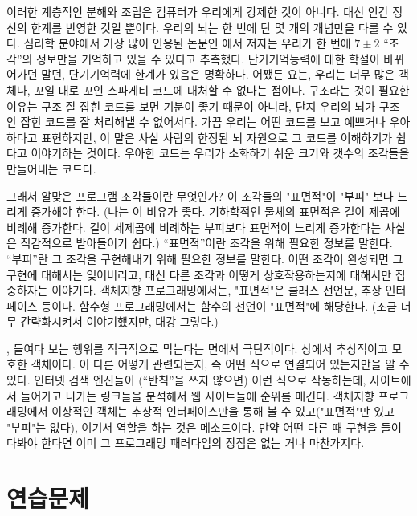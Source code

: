 이러한 계층적인 분해와 조립은 컴퓨터가 우리에게 강제한 것이 아니다.
대신 인간 정신의 한계를 반영한 것일 뿐이다. 우리의 뇌는 한 번에 단 몇 개의 개념만을 다룰 수 있다.
심리학 분야에서 가장 많이 인용된 논문인 
에서 저자는 우리가 한 번에 $7 \pm 2$ ``조각''의 정보만을 기억하고 있을 수 있다고 추측했다.
단기기억능력에 대한 학설이 바뀌어가던 말던, 단기기억력에 한계가 있음은 명확하다.
어쨌든 요는, 우리는 너무 많은 객체나, 꼬일 대로 꼬인 스파게티 코드에 대처할 수 없다는 점이다.
구조라는 것이 필요한 이유는 구조 잘 잡힌 코드를 보면 기분이 좋기 때문이 아니라,
단지 우리의 뇌가 구조 안 잡힌 코드를 잘 처리해낼 수 없어서다.
가끔 우리는 어떤 코드를 보고 예쁘거나 우아하다고 표현하지만, 이 말은 사실
사람의 한정된 뇌 자원으로 그 코드를 이해하기가 쉽다고 이야기하는 것이다.
우아한 코드는 우리가 소화하기 쉬운 크기와 갯수의 조각들을 만들어내는 코드다.

그래서  알맞은 프로그램 조각들이란 무엇인가?
이 조각들의 "표면적"이 "부피" 보다 느리게 증가해야 한다.
(나는 이 비유가 좋다. 기하학적인 물체의 표면적은 길이 제곱에 비례해 증가한다.
길이 세제곱에 비례하는 부피보다 표면적이 느리게 증가한다는 사실은 직감적으로 받아들이기 쉽다.)
``표면적''이란 조각을  위해 필요한 정보를 말한다.
``부피''란 그 조각을 구현해내기 위해 필요한 정보를 말한다.
어떤 조각이 완성되면 그 구현에 대해서는 잊어버리고,
대신 다른 조각과 어떻게 상호작용하는지에 대해서만 집중하자는 이야기다.
객체지향 프로그래밍에서는, "표면적"은 클래스 선언문, 추상 인터페이스 등이다.
함수형 프로그래밍에서는 함수의 선언이 "표면적"에 해당한다. (조금 너무 간략화시켜서 이야기했지만, 대강 그렇다.)

\trCategoryTheory\는,  들여다 보는 행위를 적극적으로 막는다는 면에서 극단적이다.
\trCategoryTheory 상에서  추상적이고 모호한 객체이다.
이  다른  어떻게 관련되는지, 즉  어떤 식으로 연결되어 있는지만을 알 수 있다.
인터넷 검색 엔진들이 (``반칙''을 쓰지 않으면) 이런 식으로 작동하는데, 
사이트에서 들어가고 나가는 링크들을 분석해서 웹 사이트들에 순위를 매긴다.
객체지향 프로그래밍에서 이상적인 객체는 추상적 인터페이스만을 통해 볼 수 있고("표면적"만 있고 "부피"는 없다),
여기서  역할을 하는 것은 메소드이다. 
만약 어떤  다른   때  구현을 들여다봐야 한다면
이미 그 프로그래밍 패러다임의 장점은 없는 거나 마찬가지다.

\section{연습문제}

